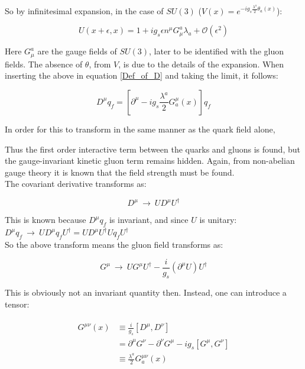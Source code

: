 \documentclass[10pt]{report}
\begin{document}
	So by infinitesimal expansion, in the case of $SU(3)$ ($V(x) = e^{-ig_s\frac{\lambda^a}{2}\theta_a(x)}$):
	
	\begin{equation}
	U(x+\epsilon, x) = 1 + ig_s\epsilon n^\mu G_\mu^a \lambda_a + \mathcal{O}(\epsilon^2)
	\end{equation}
	
	Here $G_\mu^a$ are the gauge fields of $SU(3)$, later to be identified with the gluon fields. The absence of $\theta$, from $V$, is due to the details of the expansion. When inserting the above in equation \ref{Def_of_D} and taking the limit, it follows:
	
	\begin{equation}
	D^\mu q_f = \left[ \partial^\mu - ig_s\frac{\lambda^a}{2}G_a^\mu(x) \right]q_f
	\end{equation}
	
	In order for this to transform in the same manner as the quark field alone,
	
	Thus the first order interactive term between the quarks and gluons is found, but the gauge-invariant kinetic gluon term remains hidden. Again, from non-abelian gauge theory it is known that the field strength must be found.\\
	The covariant derivative transforms as:
	
	\begin{equation}
	D^\mu \:\rightarrow\: UD^\mu U^\dagger
	\end{equation}
	
	This is known because $D^\mu q_f$ is invariant, and since $U$ is unitary: $D^\mu q_f \:\rightarrow\: UD^\mu q_fU^\dagger = UD^\mu U^\dagger U q_fU^\dagger$\\ So the above transform means the gluon field transforms as:
	
	\begin{equation}
	G^\mu \:\rightarrow\: UG^\mu U^\dagger - \frac{i}{g_s}(\partial^\mu U)U^\dagger
	\end{equation}
	
	This is obviously not an invariant quantity then. Instead, one can introduce a tensor:
	
	\begin{align}
		\begin{split}
		G^{\mu\nu}(x) &\equiv \frac{i}{g_s}[D^\mu,D^\nu]\\
		&= \partial^\mu G^\nu - \partial^\nu G^\mu - ig_s[G^\mu,G^\nu]\\
		&\equiv \frac{\lambda^a}{2}G_a^{\mu\nu}(x)
		\end{split}
	\end{align}
	
\end{document}

